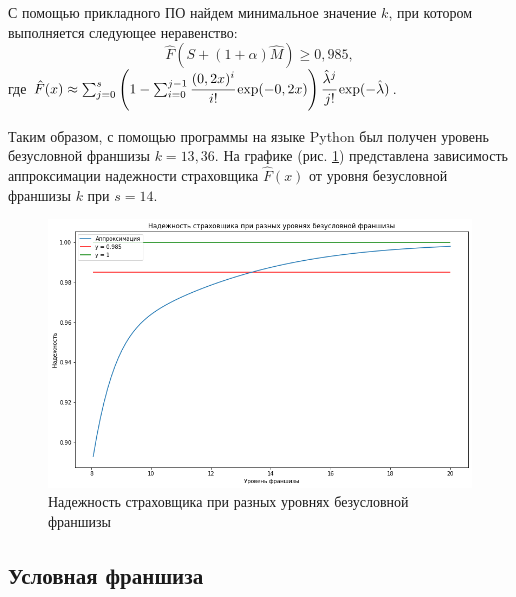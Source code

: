 \documentclass[a4paper,12pt]{article}
\begin{document}
С помощью прикладного ПО найдем минимальное значение $k$, при котором выполняется следующее неравенство:
\[\hat{F}(S + (1 + \alpha)\hat{M}) \ge 0,985,\]
где $\hat{F}(x) \approx \sum_{j = 0}^{s} \left(1 - \sum_{i = 0}^{j - 1} \cfrac{(0,2 x)^i}{i!} \exp(-0,2x)\right) \cfrac{\hat{\lambda}^j}{j!}\exp (-\hat{\lambda})$.

Таким образом, с помощью программы на языке Python был получен уровень безусловной франшизы $k=13,36$. На графике (рис. \ref{fig:graph1}) представлена зависимость аппроксимации надежности страховщика $\hat{F}(x)$ от уровня безусловной франшизы $k$ при $s = 14$.

\begin{figure}[H]
	\centering
	\includegraphics[width=0.9\linewidth]{graph1}
	\caption{Надежность страховщика при разных уровнях безусловной франшизы}
	\label{fig:graph1}
\end{figure}

\subsection{Условная франшиза}
\end{document}
